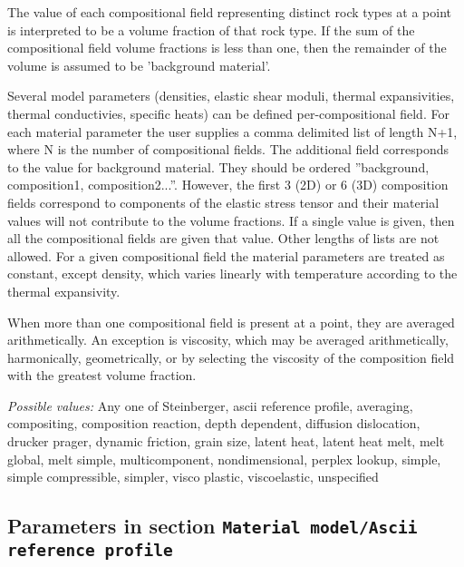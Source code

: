 \begin{itemize}
 The value of each compositional field representing distinct rock types at a point is interpreted to be a volume fraction of that rock type. If the sum of the compositional field volume fractions is less than one, then the remainder of the volume is assumed to be 'background material'.

 Several model parameters (densities, elastic shear moduli, thermal expansivities, thermal conductivies, specific heats) can be defined per-compositional field. For each material parameter the user supplies a comma delimited list of length N+1, where N is the number of compositional fields. The additional field corresponds to the value for background material. They should be ordered ''background, composition1, composition2...''. However, the first 3 (2D) or 6 (3D) composition fields correspond to components of the elastic stress tensor and their material values will not contribute to the volume fractions. If a single value is given, then all the compositional fields are given that value. Other lengths of lists are not allowed. For a given compositional field the material parameters are treated as constant, except density, which varies linearly with temperature according to the thermal expansivity. 

 When more than one compositional field is present at a point, they are averaged arithmetically. An exception is viscosity, which may be averaged arithmetically, harmonically, geometrically, or by selecting the viscosity of the composition field with the greatest volume fraction.


{\it Possible values:} Any one of Steinberger, ascii reference profile, averaging, compositing, composition reaction, depth dependent, diffusion dislocation, drucker prager, dynamic friction, grain size, latent heat, latent heat melt, melt global, melt simple, multicomponent, nondimensional, perplex lookup, simple, simple compressible, simpler, visco plastic, viscoelastic, unspecified
\end{itemize}



\subsection{Parameters in section \tt Material model/Ascii reference profile}
\label{parameters:Material_20model/Ascii_20reference_20profile}

